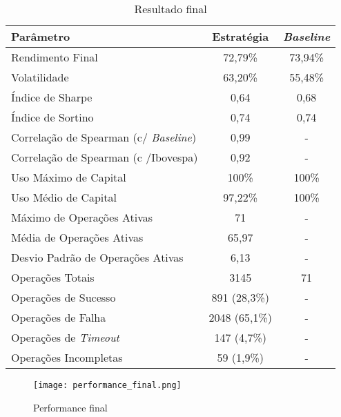 \begin{table}[h!] %
    \begin{center}
        \begin{tabular}{ l|c|c }
            Parâmetro & Estratégia & \textit{Baseline} \\
            \hline
            Rendimento Final & 72,79\% & 73,94\% \\
            Volatilidade & 63,20\% & 55,48\% \\
            Índice de Sharpe & 0,64 & 0,68 \\
            Índice de Sortino & 0,74 & 0,74 \\
            Correlação de Spearman (c/ \textit{Baseline}) & 0,99 & - \\
            Correlação de Spearman (c /Ibovespa) & 0,92 & - \\
            Uso Máximo de Capital & 100\% & 100\% \\
            Uso Médio de Capital & 97,22\% & 100\% \\
            Máximo de Operações Ativas & 71 & - \\
            Média de Operações Ativas & 65,97 & - \\
            Desvio Padrão de Operações Ativas & 6,13 & -\\
            Operações Totais & 3145 & 71 \\
            Operações de Sucesso & 891 (28,3\%) & - \\
            Operações de Falha & 2048 (65,1\%) & - \\
            Operações de \textit{Timeout} & 147 (4,7\%) & - \\
            Operações Incompletas & 59 (1,9\%) & - \\
        \end{tabular}
        \caption{Resultado final}
        \label{tab:13}
    \end{center}
\end{table}

\begin{figure}[!htb]
    \texttt{[image: performance\_final.png]}
    \centering
    \caption{Performance final}
    \label{fig:250}
\end{figure}

